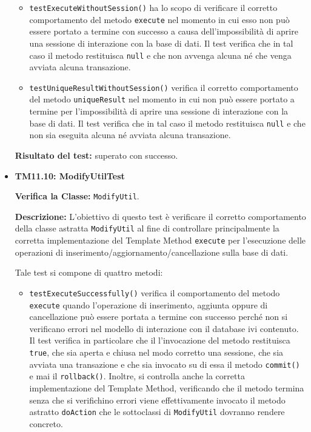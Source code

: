 \begin{itemize}
\begin{itemize}
\item \texttt{testExecuteWithoutSession()} ha lo scopo di verificare il corretto comportamento del metodo \texttt{execute} nel momento in cui esso non può essere portato a termine con successo a causa dell'impossibilità di aprire una sessione di interazione con la base di dati. Il test verifica che in tal caso il metodo restituisca \texttt{null} e che non avvenga alcuna  né che venga avviata alcuna transazione.

\item \texttt{testUniqueResultWithoutSession()} verifica il corretto comportamento del metodo \texttt{uniqueResult} nel momento in cui non può essere portato a termine per l'impossibilità di aprire una sessione di interazione con la base di dati. Il test verifica che in tal caso il metodo restituisca \texttt{null} e che non sia eseguita alcuna  né avviata alcuna transazione.

\end{itemize}
\textbf{Risultato del test:} superato con successo.

\item \textbf{TM11.10: ModifyUtilTest}

\textbf{Verifica la Classe:} \texttt{ModifyUtil}.

\textbf{Descrizione:} L'obiettivo di questo test è verificare il corretto comportamento della classe astratta \texttt{ModifyUtil} al fine di controllare principalmente la corretta implementazione del Template Method \texttt{execute} per l'esecuzione delle operazioni di inserimento/aggiornamento/cancellazione sulla base di dati.

Tale test si compone di quattro metodi:
\begin{itemize}
  \item \texttt{testExecuteSuccessfully()} verifica il comportamento del metodo \texttt{execute} quando l'operazione di inserimento, aggiunta oppure di cancellazione può essere portata a termine con successo perché non si verificano errori nel modello di interazione con il database ivi contenuto. Il test verifica in particolare che il l'invocazione del metodo restituisca \texttt{true}, che sia aperta e chiusa nel modo corretto una sessione, che sia avviata una transazione e che sia invocato su di essa il metodo \texttt{commit()} e mai il \texttt{rollback()}. Inoltre, si controlla anche la corretta implementazione del  Template Method, verificando che il metodo termina senza che si verifichino errori viene effettivamente invocato il metodo astratto \texttt{doAction} che le sottoclassi di \texttt{ModifyUtil} dovranno rendere concreto.
  

\end{itemize}
\end{itemize}
